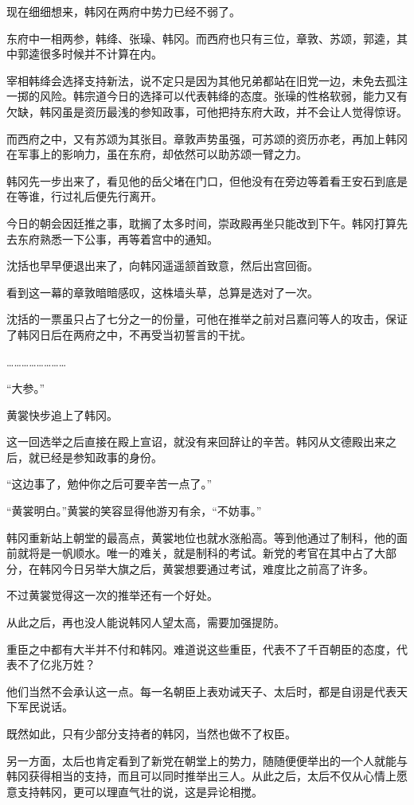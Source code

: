 现在细细想来，韩冈在两府中势力已经不弱了。

东府中一相两参，韩绛、张璪、韩冈。而西府也只有三位，章敦、苏颂，郭逵，其中郭逵很多时候并不计算在内。

宰相韩绛会选择支持新法，说不定只是因为其他兄弟都站在旧党一边，未免去孤注一掷的风险。韩宗道今日的选择可以代表韩绛的态度。张璪的性格软弱，能力又有欠缺，韩冈虽是资历最浅的参知政事，可他把持东府大政，并不会让人觉得惊讶。

而西府之中，又有苏颂为其张目。章敦声势虽强，可苏颂的资历亦老，再加上韩冈在军事上的影响力，虽在东府，却依然可以助苏颂一臂之力。

韩冈先一步出来了，看见他的岳父堵在门口，但他没有在旁边等着看王安石到底是在等谁，行过礼后便先行离开。

今日的朝会因廷推之事，耽搁了太多时间，崇政殿再坐只能改到下午。韩冈打算先去东府熟悉一下公事，再等着宫中的通知。

沈括也早早便退出来了，向韩冈遥遥颔首致意，然后出宫回衙。

看到这一幕的章敦暗暗感叹，这株墙头草，总算是选对了一次。

沈括的一票虽只占了七分之一的份量，可他在推举之前对吕嘉问等人的攻击，保证了韩冈日后在两府之中，不再受当初誓言的干扰。

……………………

“大参。”

黄裳快步追上了韩冈。

这一回选举之后直接在殿上宣诏，就没有来回辞让的辛苦。韩冈从文德殿出来之后，就已经是参知政事的身份。

“这边事了，勉仲你之后可要辛苦一点了。”

“黄裳明白。”黄裳的笑容显得他游刃有余，“不妨事。”

韩冈重新站上朝堂的最高点，黄裳地位也就水涨船高。等到他通过了制科，他的面前就将是一帆顺水。唯一的难关，就是制科的考试。新党的考官在其中占了大部分，在韩冈今日另举大旗之后，黄裳想要通过考试，难度比之前高了许多。

不过黄裳觉得这一次的推举还有一个好处。

从此之后，再也没人能说韩冈人望太高，需要加强提防。

重臣之中都有大半并不付和韩冈。难道说这些重臣，代表不了千百朝臣的态度，代表不了亿兆万姓？

他们当然不会承认这一点。每一名朝臣上表劝诫天子、太后时，都是自诩是代表天下军民说话。

既然如此，只有少部分支持者的韩冈，当然也做不了权臣。

另一方面，太后也肯定看到了新党在朝堂上的势力，随随便便举出的一个人就能与韩冈获得相当的支持，而且可以同时推举出三人。从此之后，太后不仅从心情上愿意支持韩冈，更可以理直气壮的说，这是异论相搅。


